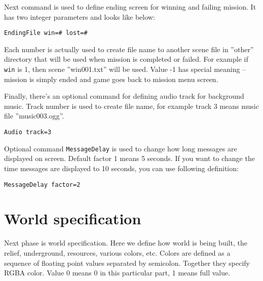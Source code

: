 Next command is used to define ending screen for winning and failing mission. It has two integer parameters and looks like below:

\begin{verbatim}
EndingFile win=# lost=#
\end{verbatim}

Each number is actually used to create file name to another scene file in ''other'' directory that will be used when mission is completed or failed. For example if \texttt{win} is 1, then scene ''win001.txt'' will be used. Value -1 has special meaning -- mission is simply ended and game goes back to mission menu screen.


Finally, there's an optional command for defining audio track for background music. Track number is used to create file name, for example track 3 means music file ''music003.ogg''.

\begin{verbatim}
Audio track=3
\end{verbatim}


Optional command \texttt{MessageDelay} is used to change how long messages are displayed on screen. Default factor 1 means 5 seconds. If you want to change the time messages are displayed to 10 seconds, you can use following definition:

\begin{verbatim}
MessageDelay factor=2
\end{verbatim}


\section{World specification}

Next phase is world specification. Here we define how world is being built, the relief, underground, resources, various colors, etc. Colors are defined as a sequence of floating point values separated by semicolon. Together they specify RGBA color. Value 0 means 0 in this particular part, 1 means full value.

